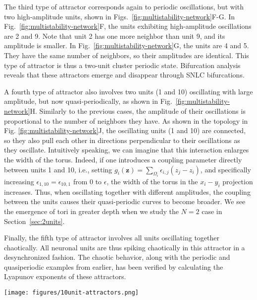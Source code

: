 The third type of attractor corresponds again to periodic oscillations, but with two high-amplitude units, shown in Figs.~\ref{fig:multistability-network}F-G. In Fig.~\ref{fig:multistability-network}F, the units exhibiting high-amplitude oscillations are 2 and 9. Note that unit 2 has one more neighbor than unit 9, and its amplitude is smaller. In Fig.~\ref{fig:multistability-network}G, the units are 4 and 5. They have the same number of neighbors, so their amplitudes are identical. This type of attractor is thus a two-unit cluster periodic state. Bifurcation analysis reveals that these attractors emerge and disappear through SNLC bifurcations.

A fourth type of attractor also involves two units (1 and 10) oscillating with large amplitude, but now quasi-periodically, as shown in Fig.~\ref{fig:multistability-network}H. Similarly to the previous cases, the amplitude of their oscillations is proportional to the number of neighbors they have. As shown in the topology in Fig. \ref{fig:multistability-network}J, the oscillating units (1 and 10) are connected, so they also pull each other in directions perpendicular to their oscillations as they oscillate. Intuitively speaking, we can imagine that this interaction enlarges the width of the torus. Indeed, if one introduces a coupling parameter directly between units 1 and 10, i.e., setting $g_i(\mathbf{z}) = \sum_{\Omega_i}\epsilon_{i,j}(z_j-z_i)$, and specifically increasing $\epsilon_{1,10} = \epsilon_{10,1}$ from $0$ to $\epsilon$, the width of the torus in the $x_i-y_i$ projection increases. Thus, when oscillating together with different amplitudes, the coupling between the units causes their quasi-periodic curves to become broader. We see the emergence of tori in greater depth when we study the $N = 2$ case in Section~\ref{sec:2units}.

Finally, the fifth type of attractor involves all units oscillating together chaotically. All neuronal units are thus spiking chaotically in this attractor in a desynchronized fashion. The chaotic behavior, along with the periodic and quasiperiodic examples from earlier, has been verified by calculating the Lyapunov exponents of these attractors.

\begin{figure*}[ht!]
    \centering 
    \texttt{[image: figures/10unit-attractors.png]}
    \caption{\textbf{Rich multistability arising from diffusive coupling.} Panels I-H show the stable equilibrium, periodic, quasi-periodic and chaotic attractors that coexist in the same network with $N=10$ randomly coupled units (shown in Panel J) with $\epsilon=0.15$. Each panel shows a trajectory on one of the attractors, projected onto the $x_i-y_i$ subspaces of each unit, all overlaid on top of each other. Circles correspond to the positions of the units at some arbitrarily chosen time point. The units are colored from blue to red according to their index, as shown in the topology of panel J, such that unit $1$ is a deep blue and unit $10$ is a deep red.}
    \label{fig:multistability-network}
\end{figure*}

